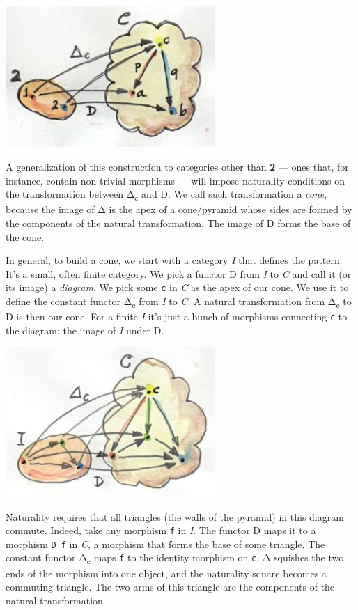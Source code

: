 \includegraphics[width=3.12500in]{images/productcone.jpg}

A generalization of this construction to categories other than
\textbf{2} --- ones that, for instance, contain non-trivial morphisms
--- will impose naturality conditions on the transformation between
Δ\textsubscript{c} and D. We call such transformation a \emph{cone},
because the image of Δ is the apex of a cone/pyramid whose sides are
formed by the components of the natural transformation. The image of D
forms the base of the cone.

In general, to build a cone, we start with a category \emph{I} that
defines the pattern. It's a small, often finite category. We pick a
functor D from \emph{I} to \emph{C} and call it (or its image) a
\emph{diagram}. We pick some \texttt{c} in \emph{C} as the apex of our
cone. We use it to define the constant functor Δ\textsubscript{c} from
\emph{I} to \emph{C}. A natural transformation from Δ\textsubscript{c}
to D is then our cone. For a finite \emph{I} it's just a bunch of
morphisms connecting \texttt{c} to the diagram: the image of \emph{I}
under D.

\includegraphics[width=3.12500in]{images/cone.jpg}

Naturality requires that all triangles (the walls of the pyramid) in
this diagram commute. Indeed, take any morphism \texttt{f} in \emph{I}.
The functor D maps it to a morphism \texttt{D\ f} in \emph{C}, a
morphism that forms the base of some triangle. The constant functor
Δ\textsubscript{c} maps \texttt{f} to the identity morphism on
\texttt{c}. Δ squishes the two ends of the morphism into one object, and
the naturality square becomes a commuting triangle. The two arms of this
triangle are the components of the natural transformation.

